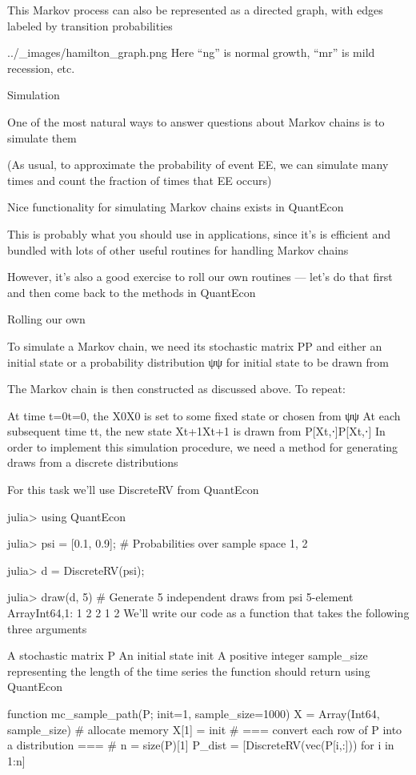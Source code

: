 This Markov process can also be represented as a directed graph, with edges labeled by transition probabilities

../_images/hamilton_graph.png
Here “ng” is normal growth, “mr” is mild recession, etc.

Simulation

One of the most natural ways to answer questions about Markov chains is to simulate them

(As usual, to approximate the probability of event EE, we can simulate many times and count the fraction of times that EE occurs)

Nice functionality for simulating Markov chains exists in QuantEcon

This is probably what you should use in applications, since it’s is efficient and bundled with lots of other useful routines for handling Markov chains

However, it’s also a good exercise to roll our own routines — let’s do that first and then come back to the methods in QuantEcon

Rolling our own

To simulate a Markov chain, we need its stochastic matrix PP and either an initial state or a probability distribution ψψ for initial state to be drawn from

The Markov chain is then constructed as discussed above. To repeat:

At time t=0t=0, the X0X0 is set to some fixed state or chosen from ψψ
At each subsequent time tt, the new state Xt+1Xt+1 is drawn from P[Xt,⋅]P[Xt,⋅]
In order to implement this simulation procedure, we need a method for generating draws from a discrete distributions

For this task we’ll use DiscreteRV from QuantEcon

julia> using QuantEcon

julia> psi = [0.1, 0.9];      # Probabilities over sample space {1, 2}

julia> d = DiscreteRV(psi);

julia> draw(d, 5)             # Generate 5 independent draws from psi
5-element Array{Int64,1}:
 1
 2
 2
 1
 2
We’ll write our code as a function that takes the following three arguments

A stochastic matrix P
An initial state init
A positive integer sample_size representing the length of the time series the function should return
using QuantEcon

function mc_sample_path(P; init=1, sample_size=1000)
    X = Array(Int64, sample_size) # allocate memory
    X[1] = init
    # === convert each row of P into a distribution === #
    n = size(P)[1]
    P_dist = [DiscreteRV(vec(P[i,:])) for i in 1:n]


